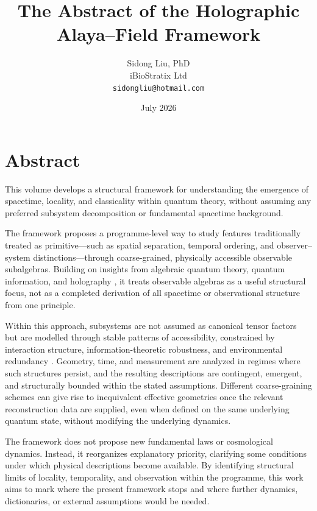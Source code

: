 \documentclass[12pt,a4paper]{article}
\title{The Abstract of the Holographic Alaya–Field Framework}
\author{
  Sidong Liu, PhD \\
  iBioStratix Ltd \\
  \texttt{sidongliu@hotmail.com}
}
\date{July 2026}
\begin{document}
\maketitle


\section*{Abstract}

This volume develops a structural framework for understanding the emergence of spacetime, locality, and classicality within quantum theory, without assuming any preferred subsystem decomposition or fundamental spacetime background.

The framework proposes a programme-level way to study features traditionally treated as primitive---such as spatial separation, temporal ordering, and observer--system distinctions---through coarse-grained, physically accessible observable subalgebras. Building on insights from algebraic quantum theory, quantum information, and holography \cite{Haag1996,Zanardi2001,Zanardi2004,RyuTakayanagi2006,VanRaamsdonk2010}, it treats observable algebras as a useful structural focus, not as a completed derivation of all spacetime or observational structure from one principle.

Within this approach, subsystems are not assumed as canonical tensor factors but are modelled through stable patterns of accessibility, constrained by interaction structure, information-theoretic robustness, and environmental redundancy \cite{Zurek2009}. Geometry, time, and measurement are analyzed in regimes where such structures persist, and the resulting descriptions are contingent, emergent, and structurally bounded within the stated assumptions. Different coarse-graining schemes can give rise to inequivalent effective geometries once the relevant reconstruction data are supplied, even when defined on the same underlying quantum state, without modifying the underlying dynamics.

The framework does not propose new fundamental laws or cosmological dynamics. Instead, it reorganizes explanatory priority, clarifying some conditions under which physical descriptions become available. By identifying structural limits of locality, temporality, and observation within the programme, this work aims to mark where the present framework stops and where further dynamics, dictionaries, or external assumptions would be needed.
\end{document}
